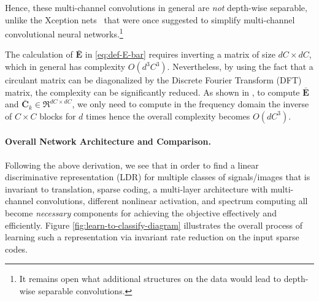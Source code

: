 \documentclass[../../book-main.tex]{subfiles}
\begin{document}
Hence, these multi-channel convolutions in general are {\em not} depth-wise separable, unlike the  Xception nets~\cite{Xception} that were once suggested to simplify multi-channel convolutional neural networks.\footnote{It remains open what additional structures on the data would lead to depth-wise separable convolutions.} 

\begin{remark} 
The calculation of $\bar{\bm E}$ in \eqref{eq:def-E-bar} requires inverting a matrix of size $dC \times dC$, which in general has complexity $O(d^3C^3)$.  Nevertheless, by using the fact that a circulant matrix can be diagonalized by the Discrete Fourier Transform (DFT) matrix, the complexity can be significantly reduced. As shown in \cite{chan2021redunet}, to compute $\bar{\bm E}$ and $\bar{\bm C}_k \in \Re^{dC \times dC}$, we only need to compute in the frequency domain the inverse of $C\times C$ blocks for $d$ times hence the overall complexity becomes $O(dC^3)$.
    
\end{remark}




\paragraph{Overall Network Architecture and Comparison.} 
Following the above derivation, we see that in order to find a linear discriminative representation (LDR)  for multiple classes of signals/images that is invariant to translation, sparse coding, a multi-layer architecture with multi-channel convolutions, different nonlinear activation, and spectrum computing all become {\em necessary} components for achieving the objective effectively and efficiently. Figure \ref{fig:learn-to-classify-diagram} illustrates the overall process of learning such a representation via invariant rate reduction on the input sparse codes. 
\end{document}
